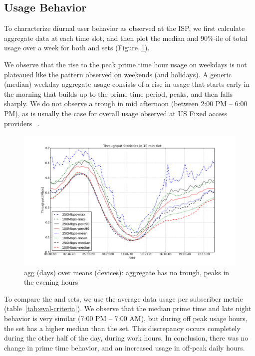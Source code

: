 \subsection{Usage Behavior}
\label{subsec:behavior}

To characterize diurnal user behavior as observed at the ISP, we first calculate
aggregate data at each time slot, and then plot the median and 90\%-ile of total
usage over a week for both \test and \control sets (Figure~\ref{fig:TS-data-rate-daily}).

We observe that the rise to the peak prime time hour usage on weekdays
is not plateaued like the pattern observed on weekends (and holidays).
A generic (median) weekday aggregate usage consists of a rise in usage that starts
early in the morning that builds up to the prime-time period, peaks, and then falls sharply.
We do not observe a trough in mid afternoon (between 2:00 PM -- 6:00 PM), as is usually
the case for overall usage observed at US Fixed access providers ~\cite{sandvine2014report1}.

\begin{figure}[ht!]
\begin{minipage}{\linewidth}
  \centering
  \includegraphics[width=\linewidth]{figures/describe-total-throughput-per-day[replace].png}
  \caption{agg (days) over means (devices): aggregate has no trough, peaks in the evening hours}
  \label{fig:TS-data-rate-daily}
\end{minipage}
\end{figure}

To compare the \test and \control sets, we use the average data usage per subscriber
metric (table~\ref{tab:eval-criteria}). We observe that the median prime time and late night
behavior is very similar (7:00 PM -- 7:00 AM), but during off peak usage hours, the \test
set has a higher median than the \control set. This discrepancy occurs completely during the
other half of the day, during work hours. In conclusion, there was no change in
prime time behavior, and an increased usage in off-peak daily hours.


